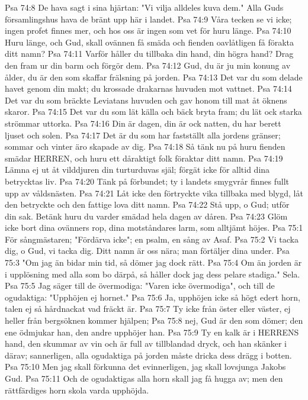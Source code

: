 Psa 74:8  De hava sagt i sina hjärtan: "Vi vilja alldeles kuva dem." Alla Guds församlingshus hava de bränt upp här i landet.
Psa 74:9  Våra tecken se vi icke; ingen profet finnes mer, och hos oss är ingen som vet för huru länge.
Psa 74:10  Huru länge, och Gud, skall ovännen få smäda och fienden oavlåtligen få förakta ditt namn?
Psa 74:11  Varför håller du tillbaka din hand, din högra hand? Drag den fram ur din barm och förgör dem.
Psa 74:12  Gud, du är ju min konung av ålder, du är den som skaffar frälsning på jorden.
Psa 74:13  Det var du som delade havet genom din makt; du krossade drakarnas huvuden mot vattnet.
Psa 74:14  Det var du som bräckte Leviatans huvuden och gav honom till mat åt öknens skaror.
Psa 74:15  Det var du som lät källa och bäck bryta fram; du lät ock starka strömmar uttorka.
Psa 74:16  Din är dagen, din är ock natten, du har berett ljuset och solen.
Psa 74:17  Det är du som har fastställt alla jordens gränser; sommar och vinter äro skapade av dig.
Psa 74:18  Så tänk nu på huru fienden smädar HERREN, och huru ett dåraktigt folk föraktar ditt namn.
Psa 74:19  Lämna ej ut åt vilddjuren din turturduvas själ; förgät icke för alltid dina betrycktas liv.
Psa 74:20  Tänk på förbundet; ty i landets smygvrår finnes fullt upp av våldsnästen.
Psa 74:21  Låt icke den förtryckte vika tillbaka med blygd, låt den betryckte och den fattige lova ditt namn.
Psa 74:22  Stå upp, o Gud; utför din sak. Betänk huru du varder smädad hela dagen av dåren.
Psa 74:23  Glöm icke bort dina ovänners rop, dina motståndares larm, som alltjämt höjes.
Psa 75:1  För sångmästaren; "Fördärva icke"; en psalm, en sång av Asaf.
Psa 75:2  Vi tacka dig, o Gud, vi tacka dig. Ditt namn är oss nära; man förtäljer dina under.
Psa 75:3  "Om jag än bidar min tid, så dömer jag dock rätt.
Psa 75:4  Om än jorden är i upplösning med alla som bo därpå, så håller dock jag dess pelare stadiga." Sela.
Psa 75:5  Jag säger till de övermodiga: "Varen icke övermodiga", och till de ogudaktiga: "Upphöjen ej hornet."
Psa 75:6  Ja, upphöjen icke så högt edert horn, talen ej så hårdnackat vad fräckt är.
Psa 75:7  Ty icke från öster eller väster, ej heller från bergsöknen kommer hjälpen;
Psa 75:8  nej, Gud är den som dömer; den ene ödmjukar han, den andre upphöjer han.
Psa 75:9  Ty en kalk är i HERRENS hand, den skummar av vin och är full av tillblandad dryck, och han skänker i därav; sannerligen, alla ogudaktiga på jorden måste dricka dess drägg i botten.
Psa 75:10  Men jag skall förkunna det evinnerligen, jag skall lovsjunga Jakobs Gud.
Psa 75:11  Och de ogudaktigas alla horn skall jag få hugga av; men den rättfärdiges horn skola varda upphöjda.
